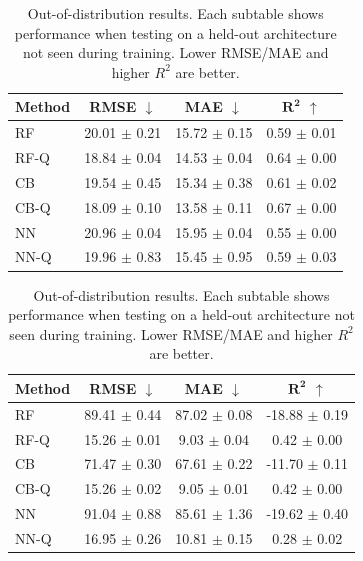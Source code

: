 \begin{table}[t]
    \centering
    \caption{Out-of-distribution results. Each subtable shows performance when testing on a held-out architecture not seen during training. Lower RMSE/MAE and higher $R^2$ are better.}
    \label{tab:ood-results}
    \vspace{0.5em}
    \begin{minipage}{0.48\textwidth}
        \centering
        \label{tab:ood-rtx5000}
        \begin{tabular}{lccc}
            \toprule
            \textbf{Method} & \textbf{RMSE} $\downarrow$ & \textbf{MAE} $\downarrow$ & $\boldsymbol{R^2}$ $\uparrow$ \\
            \midrule
            RF      & 20.01 $\pm$ 0.21 & 15.72 $\pm$ 0.15 & 0.59 $\pm$ 0.01 \\
            RF-Q    & 18.84 $\pm$ 0.04 & 14.53 $\pm$ 0.04 & 0.64 $\pm$ 0.00 \\
            \midrule
            CB      & 19.54 $\pm$ 0.45 & 15.34 $\pm$ 0.38 & 0.61 $\pm$ 0.02 \\
            CB-Q    & 18.09 $\pm$ 0.10 & 13.58 $\pm$ 0.11 & 0.67 $\pm$ 0.00 \\
            \midrule
            NN      & 20.96 $\pm$ 0.04 & 15.95 $\pm$ 0.04 & 0.55 $\pm$ 0.00 \\
            NN-Q    & 19.96 $\pm$ 0.83 & 15.45 $\pm$ 0.95 & 0.59 $\pm$ 0.03 \\
            \bottomrule
        \end{tabular}
    \end{minipage}
    \hfill
    \begin{minipage}{0.48\textwidth}
        \centering
        \label{tab:ood-rtx4000}
        \begin{tabular}{lccc}
            \toprule
            \textbf{Method} & \textbf{RMSE} $\downarrow$ & \textbf{MAE} $\downarrow$ & $\boldsymbol{R^2}$ $\uparrow$ \\
            \midrule
            RF      & 89.41 $\pm$ 0.44 & 87.02 $\pm$ 0.08 & -18.88 $\pm$ 0.19 \\
            RF-Q    & 15.26 $\pm$ 0.01 & 9.03 $\pm$ 0.04 & 0.42 $\pm$ 0.00 \\
            \midrule
            CB      & 71.47 $\pm$ 0.30 & 67.61 $\pm$ 0.22 & -11.70 $\pm$ 0.11 \\
            CB-Q    & 15.26 $\pm$ 0.02 & 9.05 $\pm$ 0.01 & 0.42 $\pm$ 0.00 \\
            \midrule
            NN      & 91.04 $\pm$ 0.88 & 85.61 $\pm$ 1.36 & -19.62 $\pm$ 0.40 \\
            NN-Q    & 16.95 $\pm$ 0.26 & 10.81 $\pm$ 0.15 & 0.28 $\pm$ 0.02 \\
            \bottomrule
        \end{tabular}
    \end{minipage}


\end{table}

